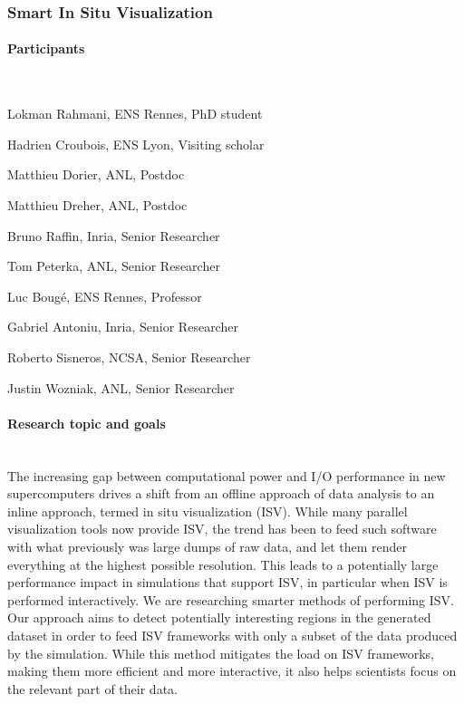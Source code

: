 
\subsubsection{Smart In Situ Visualization}
\label{sec.report.tp} %

\begin{refsection}[report2015_tp]

\paragraph{Participants}~\\

\begin{itemize*}
\item Lokman Rahmani, ENS Rennes, PhD student
\item Hadrien Croubois, ENS Lyon, Visiting scholar
\item Matthieu Dorier, ANL, Postdoc
\item Matthieu Dreher, ANL, Postdoc
\item Bruno Raffin, Inria, Senior Researcher
\item Tom Peterka, ANL, Senior Researcher
\item Luc Bougé, ENS Rennes, Professor
\item Gabriel Antoniu, Inria, Senior Researcher
\item Roberto Sisneros, NCSA, Senior Researcher
\item Justin Wozniak, ANL, Senior Researcher
\end{itemize*}

\paragraph{Research topic and goals}~\\

The increasing gap between computational power and I/O performance in new supercomputers drives
a shift from an offline approach of data analysis to an inline approach, termed in situ
visualization (ISV). While many parallel visualization tools now provide ISV, the trend has
been to feed such software with what previously was large dumps of raw data, and let them
render everything at the highest possible resolution. This leads to a potentially large
performance impact in simulations that support ISV, in particular when ISV is performed
interactively. We are researching smarter methods of performing ISV. Our approach aims
to detect potentially interesting regions in the generated dataset in order to feed ISV
frameworks with only a subset of the data produced by the simulation. While this method
mitigates the load on ISV frameworks, making them more efficient and more interactive, it also
helps scientists focus on the relevant part of their data.


\end{refsection}
